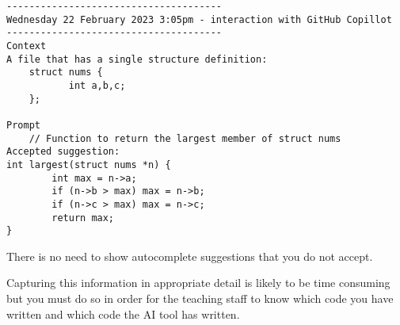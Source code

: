\documentclass{article}
\begin{document}
\nolinenumbers
{}
\begin{lstlisting}
--------------------------------------
Wednesday 22 February 2023 3:05pm - interaction with GitHub Copillot
--------------------------------------
Context
A file that has a single structure definition:
	struct nums {
     	   int a,b,c;
	};

Prompt
	// Function to return the largest member of struct nums
Accepted suggestion:
int largest(struct nums *n) {
        int max = n->a;
        if (n->b > max) max = n->b;
        if (n->c > max) max = n->c;
        return max;
}
\end{lstlisting}
\linenumbers

There is no need to show autocomplete suggestions that you do not accept. 

Capturing this information in appropriate detail is likely to be time consuming but you must do so in order for the teaching staff to know which code you have written and which code the AI tool has written.
\end{document}
